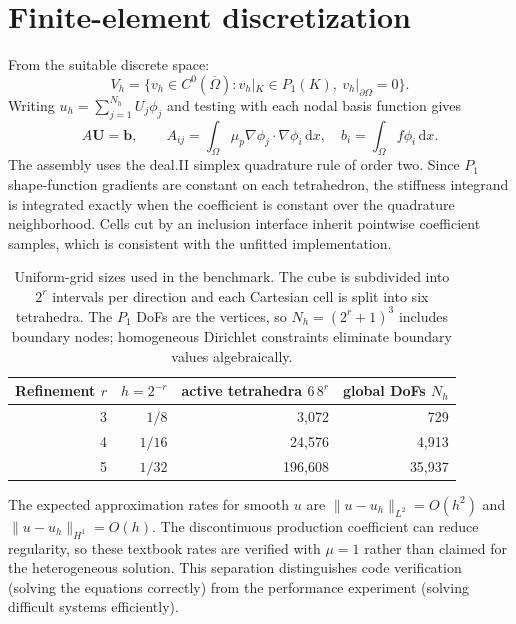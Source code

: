 \documentclass[10pt,a4paper]{article}
\begin{document}
\section{Finite-element discretization}
From the suitable discrete space:
\begin{equation}
 V_h=\{v_h\in C^0(\overline\Omega):v_h|_K\in P_1(K),\ v_h|_{\partial\Omega}=0\}.
\end{equation}
Writing $u_h=\sum_{j=1}^{N_h}U_j\phi_j$ and testing with each nodal basis function gives
\begin{equation}
 A\boldsymbol U=\boldsymbol b,\qquad
 A_{ij}=\int_\Omega\mu_p\nabla\phi_j\cdot\nabla\phi_i\,\mathrm dx,
 \quad b_i=\int_\Omega f\phi_i\,\mathrm dx.
 \label{eq:discrete}
\end{equation}
The assembly uses the deal.II simplex quadrature rule of order two. Since $P_1$ shape-function
gradients are constant on each tetrahedron, the stiffness integrand is integrated exactly when the
coefficient is constant over the quadrature neighborhood. Cells cut by an inclusion interface
inherit pointwise coefficient samples, which is consistent with the unfitted implementation.

\begin{table}[h]
\centering
\caption{Uniform-grid sizes used in the benchmark. The cube is subdivided into $2^r$ intervals per
direction and each Cartesian cell is split into six tetrahedra. The $P_1$ DoFs are the vertices,
so $N_h=(2^r+1)^3$ includes boundary nodes; homogeneous Dirichlet constraints eliminate boundary
values algebraically.}
\begin{tabular}{rrrr}
\toprule
Refinement $r$ & $h=2^{-r}$ & active tetrahedra $6\,8^r$ & global DoFs $N_h$\\
\midrule
3 & $1/8$  & 3,072    & 729\\
4 & $1/16$ & 24,576  & 4,913\\
5 & $1/32$ & 196,608 & 35,937\\
\bottomrule
\end{tabular}
\label{tab:meshes}
\end{table}

The expected approximation rates for smooth $u$ are
$\|u-u_h\|_{L^2}=O(h^2)$ and $\|u-u_h\|_{H^1}=O(h)$. The discontinuous production
coefficient can reduce regularity, so these textbook rates are verified with $\mu=1$ rather than
claimed for the heterogeneous solution. This separation distinguishes code verification (solving
the equations correctly) from the performance experiment (solving difficult systems efficiently).
\end{document}
